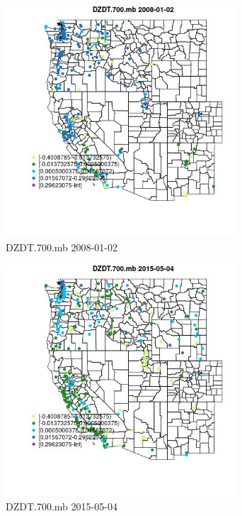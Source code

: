 \begin{figure} 
\centering  
\includegraphics[width=0.77\textwidth]{Code_Outputs/Report_ML_input_PM25_Step4_part_e_de_duplicated_aves_compiled_2019-05-18wNAs_MapObsDZDT700mb2008-01-02.jpg} 
\caption{\label{fig:Report_ML_input_PM25_Step4_part_e_de_duplicated_aves_compiled_2019-05-18wNAsMapObsDZDT700mb2008-01-02}DZDT.700.mb 2008-01-02} 
\end{figure} 
 

\clearpage 

\begin{figure} 
\centering  
\includegraphics[width=0.77\textwidth]{Code_Outputs/Report_ML_input_PM25_Step4_part_e_de_duplicated_aves_compiled_2019-05-18wNAs_MapObsDZDT700mb2015-05-04.jpg} 
\caption{\label{fig:Report_ML_input_PM25_Step4_part_e_de_duplicated_aves_compiled_2019-05-18wNAsMapObsDZDT700mb2015-05-04}DZDT.700.mb 2015-05-04} 
\end{figure} 
 

